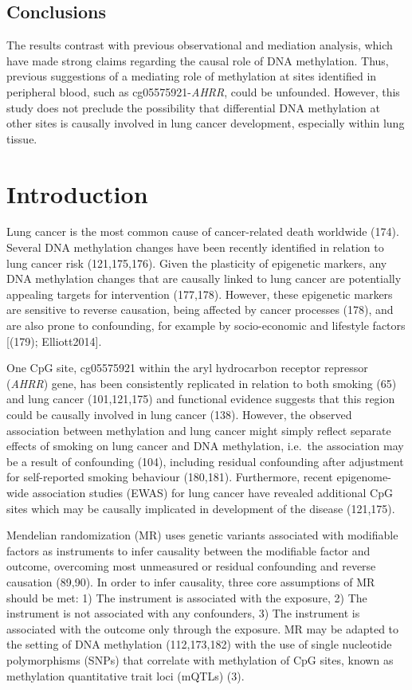 \documentclass[11pt,oneside]{bristolthesis}
\begin{document}
\hypertarget{abstract-conclusions-07}{%
\subsection{Conclusions}\label{abstract-conclusions-07}}

The results contrast with previous observational and mediation analysis, which have made strong claims regarding the causal role of DNA methylation. Thus, previous suggestions of a mediating role of methylation at sites identified in peripheral blood, such as cg05575921-\emph{AHRR}, could be unfounded. However, this study does not preclude the possibility that differential DNA methylation at other sites is causally involved in lung cancer development, especially within lung tissue.

\hypertarget{introduction-07}{%
\section{Introduction}\label{introduction-07}}

Lung cancer is the most common cause of cancer-related death worldwide (174). Several DNA methylation changes have been recently identified in relation to lung cancer risk (121,175,176). Given the plasticity of epigenetic markers, any DNA methylation changes that are causally linked to lung cancer are potentially appealing targets for intervention (177,178). However, these epigenetic markers are sensitive to reverse causation, being affected by cancer processes (178), and are also prone to confounding, for example by socio-economic and lifestyle factors {[}(179); Elliott2014{]}.

One CpG site, cg05575921 within the aryl hydrocarbon receptor repressor (\emph{AHRR}) gene, has been consistently replicated in relation to both smoking (65) and lung cancer (101,121,175) and functional evidence suggests that this region could be causally involved in lung cancer (138). However, the observed association between methylation and lung cancer might simply reflect separate effects of smoking on lung cancer and DNA methylation, i.e.~the association may be a result of confounding (104), including residual confounding after adjustment for self-reported smoking behaviour (180,181). Furthermore, recent epigenome-wide association studies (EWAS) for lung cancer have revealed additional CpG sites which may be causally implicated in development of the disease (121,175).

Mendelian randomization (MR) uses genetic variants associated with modifiable factors as instruments to infer causality between the modifiable factor and outcome, overcoming most unmeasured or residual confounding and reverse causation (89,90). In order to infer causality, three core assumptions of MR should be met: 1) The instrument is associated with the exposure, 2) The instrument is not associated with any confounders, 3) The instrument is associated with the outcome only through the exposure. MR may be adapted to the setting of DNA methylation (112,173,182) with the use of single nucleotide polymorphisms (SNPs) that correlate with methylation of CpG sites, known as methylation quantitative trait loci (mQTLs) (3).
\end{document}
